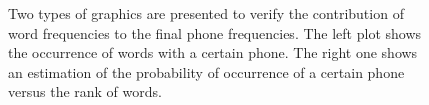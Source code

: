 \begin{figure}[p]
  \caption{Two types of graphics are presented to verify the contribution of word frequencies to the final phone frequencies. The left plot shows the occurrence of words with a certain phone. The right one shows an estimation of the probability of occurrence of a certain phone versus the rank of words.}
  \label{fig:wordszipfprobphone}
\end{figure}



